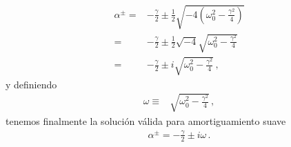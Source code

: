 \begin{align}
  \alpha^{\pm}=&-\frac{\gamma}{2}\pm\frac{1}{2}\sqrt{-4 \left(\omega_0^2-\frac{\gamma^2}{4}\right)}\nonumber\\
  =&-\frac{\gamma}{2}\pm\frac{1}{2}\sqrt{-4}\sqrt{\omega_0^2-\frac{\gamma^2}{4}}\nonumber\\
  =&-\frac{\gamma}{2}\pm i\sqrt{\omega_0^2-\frac{\gamma^2}{4}}\,,
\end{align}
y definiendo
\begin{align}
  \label{eq:newoc}
  \omega\equiv&\sqrt{\omega_0^2-\frac{\gamma^2}{4}}\,,
\end{align}
tenemos finalmente la solución válida para amortiguamiento suave
\begin{align*}
  \alpha^{\pm}=-\frac{\gamma}{2}\pm i\omega\,.
\end{align*}

